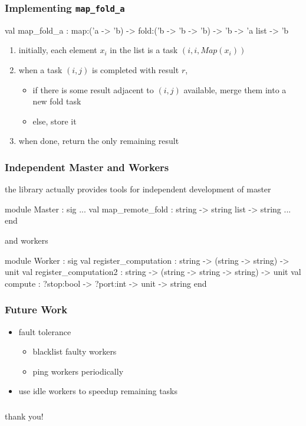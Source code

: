 \documentclass{beamer}
\let\emph\alert
\begin{document}
\begin{frame}\frametitle{Implementing \texttt{map\_fold\_a}}
  \begin{ocaml}
val map_fold_a :
  map:('a -> 'b) -> fold:('b -> 'b -> 'b) -> 
  'b -> 'a list -> 'b
  \end{ocaml}


  \begin{enumerate}
  \item initially, each element $x_i$ in the list is a task $(i,i,Map(x_i))$
  \item when a task $(i,j)$ is completed with result $r$,
    \begin{itemize}
    \item if there is some result adjacent to $(i,j)$ available,
      merge them into a new fold task
    \item else, store it
    \end{itemize}
  \item when done, return the only remaining result
  \end{enumerate}
\end{frame}


\begin{frame}\frametitle{Independent Master and Workers}
  the library actually provides tools for independent development of
  master \small

  \begin{ocaml}
module Master : sig
  ...
  val map_remote_fold : string -> string list -> string
  ...
end
  \end{ocaml}

and workers\small

  \begin{ocaml}
module Worker : sig
  val register_computation : 
    string -> (string -> string) -> unit
  val register_computation2 : 
    string -> (string -> string -> string) -> unit
  val compute : 
    ?stop:bool -> ?port:int -> unit -> string
end
  \end{ocaml}
\end{frame}

\begin{frame}\frametitle{Future Work}
  \begin{itemize}
  \item fault tolerance
    \begin{itemize}
    \item blacklist faulty workers
    \item ping workers periodically
    \end{itemize}
  \item use idle workers to speedup remaining tasks
  \end{itemize}
\end{frame}

\begin{frame}\frametitle{}
  \begin{center}
    \emph{thank you!}
  \end{center}
\end{frame}
\end{document}
